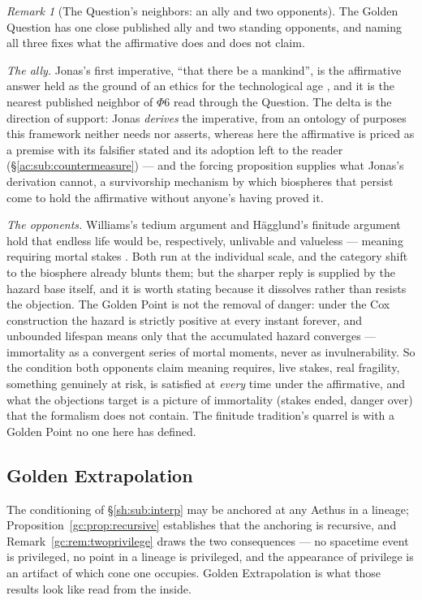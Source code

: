 \documentclass[11pt]{article}
\numberwithin{equation}{section}
\theoremstyle{plain}
\theoremstyle{definition}
\theoremstyle{remark}
\newtheorem{remark}[theorem]{Remark}
\begin{document}
\begin{remark}[The Question's neighbors: an ally and two opponents]
\label{ac:rem:questionneighbors}
The Golden Question has one close published ally and two standing
opponents, and naming all three fixes what the affirmative does and
does not claim.

\emph{The ally.} Jonas's first imperative, ``that there be a
mankind'', is the affirmative answer held as the ground of an
ethics for the technological age \cite{Jonas84}, and it is the
nearest published neighbor of $\Phi6$ read through the Question. The
delta is the direction of support: Jonas \emph{derives} the
imperative, from an ontology of purposes this framework neither needs
nor asserts, whereas here the affirmative is priced as a premise with
its falsifier stated and its adoption left to the reader
(\S\ref{ac:sub:countermeasure}) --- and the forcing proposition
supplies what Jonas's derivation cannot, a survivorship mechanism by
which biospheres that persist come to hold the affirmative without
anyone's having proved it.

\emph{The opponents.} Williams's tedium argument and H\"agglund's
finitude argument hold that endless life would be, respectively,
unlivable and valueless --- meaning requiring mortal stakes
\cite{Wil73,Hag19}. Both run at the individual scale, and the
category shift to the biosphere already blunts them; but the sharper
reply is supplied by the hazard base itself, and it is worth stating
because it dissolves rather than resists the objection. The Golden
Point is not the removal of danger: under the Cox construction the
hazard is strictly positive at every instant forever, and unbounded
lifespan means only that the accumulated hazard converges ---
immortality as a convergent series of mortal moments, never as
invulnerability. So the condition both opponents claim meaning
requires, live stakes, real fragility, something genuinely at risk, is satisfied at \emph{every} time under the affirmative, and what
the objections target is a picture of immortality (stakes ended,
danger over) that the formalism does not contain. The finitude
tradition's quarrel is with a Golden Point no one here has defined.
\end{remark}

\subsection{Golden Extrapolation}\label{ac:sub:extrapolation}

The conditioning of \S\ref{sh:sub:interp} may be anchored at any Aethus in a lineage; Proposition~\ref{gc:prop:recursive} establishes that the anchoring is recursive, and Remark~\ref{gc:rem:twoprivilege} draws the two consequences --- no spacetime event is privileged, no point in a lineage is privileged, and the appearance of privilege is an artifact of which cone one occupies. Golden Extrapolation is what those results look like read from the inside.
\end{document}
